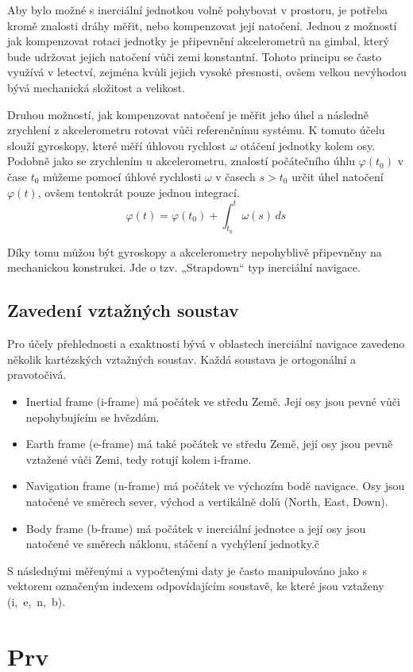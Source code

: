 Aby bylo možné s inerciální jednotkou volně pohybovat v prostoru, je potřeba kromě znalosti dráhy měřit, nebo kompenzovat její natočení. 
Jednou z možností jak kompenzovat rotaci jednotky je připevnění akcelerometrů na gimbal, který bude udržovat jejich natočení vůči zemi konstantní. Tohoto principu se často využívá v letectví, zejména kvůli jejich vysoké přesnosti, ovšem velkou nevýhodou bývá mechanická složitost a velikost. \cite{Grewal2013} \cite{Polak2018}

Druhou možností, jak kompenzovat natočení je měřit jeho úhel a následně zrychlení z akcelerometru rotovat vůči referenčnímu systému.\cite{Grewal2013} \cite{Polak2018}
K tomuto účelu slouží gyroskopy, které měří úhlovou rychlost $ \omega $ otáčení jednotky kolem osy. Podobně jako se zrychlením u akcelerometru, znalostí počátečního úhlu $ \varphi (t_{0}) $ v čase $ t_{0} $ můžeme pomocí úhlové rychlosti $ \omega $ v časech $ s>t_{0} $ určit úhel natočení $ \varphi (t) $, ovšem tentokrát pouze jednou integrací.
$$ \varphi (t)=\varphi (t_{0}) + \int_{t_{0}}^{t} \omega (s) \,ds\ $$

Díky tomu můžou být gyroskopy a akcelerometry nepohyblivě připevněny na mechanickou konstrukci. Jde o tzv. „Strapdown“ typ inerciální navigace.

\subsection{Zavedení vztažných soustav}
Pro účely přehlednosti a exaktnosti bývá v oblastech inerciální navigace zavedeno několik kartézských vztažných soustav. Každá soustava je ortogonální a pravotočivá. \cite{Pekarek2020} \cite{Tittertonc2004} 

\begin{itemize}
\item Inertial frame (i-frame) má počátek ve středu Země. Její osy jsou pevné vůči nepohybujícím se hvězdám.
\item Earth frame (e-frame) má také počátek ve středu Země, její osy jsou pevně vztažené vůči Zemi, tedy rotují kolem i-frame.
\item Navigation frame (n-frame) má počátek ve výchozím bodě navigace. Osy jsou natočené ve směrech sever, východ a vertikálně dolů (North, East, Down).
\item Body frame (b-frame) má počátek v inerciální jednotce a její osy jsou natočené ve směrech náklonu, stáčení a vychýlení jednotky.č
\end{itemize}

S následnými měřenými a vypočtenými daty je často manipulováno jako s vektorem označeným indexem odpovídajícím soustavě, ke které jsou vztaženy (i,~e,~n,~b).

\section{Prv}




